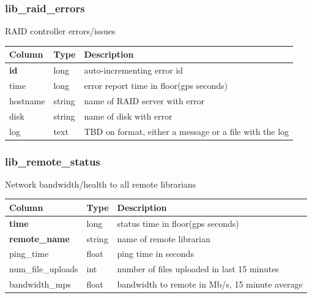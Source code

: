 \documentclass{article}
\begin{document}
{\subsubsection{lib\_raid\_errors}
RAID controller errors/issues
\begin{center}
 \begin{tabular}{| p{4cm} | p{2cm} | p{10cm} |}
\hline
 {\bf Column} & {\bf Type}  & {\bf Description} \\ [0.5ex]  \hline\hline
\textbf{id} & long & auto-incrementing error id\\ \hline
time & long & error report time in floor(gps seconds)\\ \hline
hostname & string & name of RAID server with error \\ \hline
disk & string & name of disk with error \\ \hline
log & text & TBD on format, either a message or a file with the log \\\hline
\end{tabular}
\end{center}

\subsubsection{lib\_remote\_status}
Network bandwidth/health to all remote librarians
\begin{center}
 \begin{tabular}{| p{4cm} | p{2cm} | p{10cm} |}
\hline
 {\bf Column} & {\bf Type}  & {\bf Description} \\ [0.5ex]  \hline\hline
\textbf{time} & long & status time in floor(gps seconds)\\ \hline
\textbf{remote\_name} & string & name of remote librarian \\ \hline
ping\_time & float & ping time in seconds \\\hline
num\_file\_uploads & int & number of files uploaded in last 15 minutes  \\\hline
bandwidth\_mps & float & bandwidth to remote in Mb/s, 15 minute average \\\hline
\end{tabular}
\end{center}

}
\end{document}
